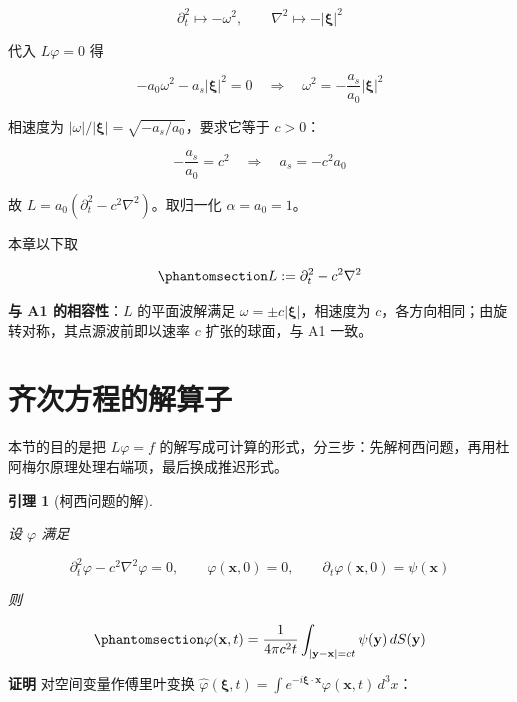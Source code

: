 \documentclass[
  chinese,
  a4paper,
  UTF8,
  12pt,
  oneside,
  openany]{ctexbook}
\theoremstyle{plain}
\theoremstyle{plain}
\theoremstyle{plain}
\theoremstyle{definition}
\theoremstyle{plain}
\theoremstyle{plain}
\newtheorem{lemma}{引理}[chapter]
\theoremstyle{remark}
\begin{document}
\[
\partial_{t}^{2}\mapsto-\omega^{2},\qquad \nabla^{2}\mapsto-|\boldsymbol{\xi}|^{2}
\]

代入 \(L\varphi=0\) 得

\[
-a_{0}\omega^{2}-a_{s}|\boldsymbol{\xi}|^{2}=0
\quad\Longrightarrow\quad
\omega^{2}=-\frac{a_{s}}{a_{0}}|\boldsymbol{\xi}|^{2}
\]

相速度为 \(|\omega|/|\boldsymbol{\xi}|=\sqrt{-a_{s}/a_{0}}\)，要求它等于
\(c>0\)：

\[
-\frac{a_{s}}{a_{0}}=c^{2}\quad\Longrightarrow\quad a_{s}=-c^{2}a_{0}
\]

故 \(L=a_{0}(\partial_{t}^{2}-c^{2}\nabla^{2})\)。取归一化
\(\alpha=a_{0}=1\)。

本章以下取

\begin{equation}\protect\phantomsection\label{eq-operator}{
L:=\partial_{t}^{2}-c^{2}\nabla^{2}
}\end{equation}

\textbf{与 A1 的相容性}：\(L\) 的平面波解满足
\(\omega=\pm c|\boldsymbol{\xi}|\)，相速度为
\(c\)，各方向相同；由旋转对称，其点源波前即以速率 \(c\) 扩张的球面，与
A1 一致。

\section{齐次方程的解算子}\label{sec-tsf-kirchhoff}

本节的目的是把 \(L\varphi=f\)
的解写成可计算的形式，分三步：先解柯西问题，再用杜阿梅尔原理处理右端项，最后换成推迟形式。

\begin{lemma}[柯西问题的解]\protect\hypertarget{lem-kirchhoff}{}\label{lem-kirchhoff}

设 \(\varphi\) 满足

\[
\partial_{t}^{2}\varphi-c^{2}\nabla^{2}\varphi=0,\qquad
\varphi(\mathbf{x},0)=0,\qquad \partial_{t}\varphi(\mathbf{x},0)=\psi(\mathbf{x})
\]

则

\begin{equation}\protect\phantomsection\label{eq-kirchhoff}{
\varphi(\mathbf{x},t)=\frac{1}{4\pi c^{2}t}\int_{|\mathbf{y}-\mathbf{x}|=ct}\psi(\mathbf{y})\,dS(\mathbf{y})
}\end{equation}

\end{lemma}

\textbf{证明} 对空间变量作傅里叶变换
\(\widehat{\varphi}(\boldsymbol{\xi},t)=\int e^{-i\boldsymbol{\xi}\cdot\mathbf{x}}\varphi(\mathbf{x},t)\,d^{3}x\)：
\end{document}
